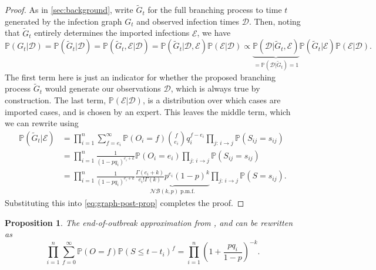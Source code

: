 \documentclass{article}
\newtheorem{proposition}{Proposition}[section]
\begin{document}
\begin{proof}
As in \autoref{sec:background}, write \(\tilde{G}_t\) for the full branching process to time \(t\) generated by the infection graph \(G_t\) and observed infection times \(\mathcal{D}\). Then, noting that \(\tilde{G}_t\) entirely determines the imported infections \(\mathcal{E}\), we have
\begin{equation}\label{eq:graph-post-prop}
    \mathbb{P}(G_t | \mathcal{D})
    = \mathbb{P}(\tilde{G}_t | \mathcal{D})
    = \mathbb{P}(\tilde{G}_t, \mathcal{E} | \mathcal{D})
    = \mathbb{P}(\tilde{G}_t | \mathcal{D}, \mathcal{E}) \mathbb{P}(\mathcal{E} | \mathcal{D})
    \propto \underbrace{\mathbb{P}(\mathcal{D} | \tilde{G}_t, \mathcal{E})}_{=\mathbb{P}(\mathcal{D} | \tilde{G}_t)=1} \mathbb{P}(\tilde{G}_t | \mathcal{E}) \mathbb{P}(\mathcal{E} | \mathcal{D}).
\end{equation}
The first term here is just an indicator for whether the proposed branching process \(\tilde{G}_t\) would generate our observations \(\mathcal{D}\), which is always true by construction. The last term, \(\mathbb{P}(\mathcal{E} | \mathcal{D})\), is a distribution over which cases are imported cases, and is chosen by an expert. This leaves the middle term, which we can rewrite using 
\begin{align*}
    \mathbb{P}(\tilde{G}_t | \mathcal{E}) &= \prod_{i=1}^n \sum_{f=e_i}^\infty \mathbb{P}(O_i = f) \binom{f}{e_i} q_i^{f-e_i} \prod_{j:\, i \to j} \mathbb{P}(S_{ij} = s_{ij}) \\
    &= \prod_{i=1}^n \frac{1}{(1-pq_i)^{e_i + k}} \mathbb{P}(O_i = e_i) \prod_{j:\, i \to j} \mathbb{P}(S_{ij} = s_{ij}) \\
    &= \prod_{i=1}^n \frac{1}{(1-pq_i)^{e_i + k}} \underbrace{\frac{\Gamma(e_i + k)}{e_i! \Gamma(k)} p^{e_i} (1-p)^k}_{\mathcal{NB}(k, p) \;\text{p.m.f.}} \prod_{j:\, i \to j} \mathbb{P}(S = s_{ij}).
\end{align*}
Substituting this into \autoref{eq:graph-post-prop} completes the proof.

\end{proof}

\begin{proposition}\label{thm:approx-alternative}
The end-of-outbreak approximation from \cite{Akhmetzhanov2021}, \cite{Linton2021} and \cite{Nishiura2016} can be rewritten as
\[\prod_{i=1}^n \sum_{f=0}^\infty \mathbb{P}(O = f) \mathbb{P}(S \leq t-t_i)^f = \prod_{i=1}^n \left(1 + \frac{pq_i}{1-p}\right)^{-k}.\]
\end{proposition}
\end{document}
